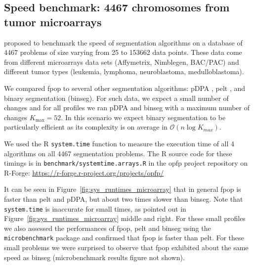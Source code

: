 \documentclass{article}
\begin{document}
\subsection{Speed benchmark: 4467 chromosomes from 
  tumor microarrays}

\citet{HOCKING-SegAnnDB} proposed to benchmark the speed of 
segmentation algorithms on a database of 4467 problems of size varying
from 25 to 153662 data points. These data come from different
microarrays data sets (Affymetrix, Nimblegen, BAC/PAC) and different
tumor types (leukemia, lymphoma, neuroblastoma, medulloblastoma).

We compared fpop to several other segmentation algorithms: pDPA
\citep{pruned-dp}, pelt \citep{pelt}, and binary segmentation
(binseg).  For such data, we expect a small number of changes and for
all profiles we ran pDPA and binseg with a maximum number of changes
$K_{\text{max}}=52$.  In this scenario we expect binary segmentation
to be particularly efficient as its complexity is on average in
$\mathcal{O}(n\log K_{max})$.

We used the R \verb|system.time| function to measure
the execution time of all 4 algorithms on all 4467 segmentation
problems. The R source code for these timings is in
\verb|benchmark/systemtime.arrays.R| in the opfp project repository on
R-Forge:
\url{https://r-forge.r-project.org/projects/opfp/}


It can be seen in Figure~\ref{fig:sys_runtimes_microarray} that in
general fpop is faster than pelt and pDPA, but about two times slower
than binseg.  Note that \verb|system.time| is inaccurate for small
times, as pointed out in Figure~\ref{fig:sys_runtimes_microarray}
middle and right.  For these small profiles we also assessed the
performances of fpop, pelt and binseg using the \verb|microbenchmark|
package and confirmed that fpop is faster than pelt. For these small
problems we were surprised to observe that fpop exhibited about the
same speed as binseg (microbenchmark results figure not shown).
 
\end{document}
